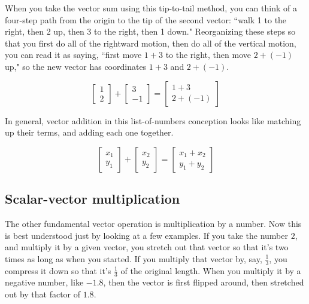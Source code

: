 When you take the vector sum using this tip-to-tail method, you can think of a
four-step path from the origin to the tip of the second vector: ``walk 1 to the
right, then 2 up, then 3 to the right, then 1 down." Reorganizing these steps so
that you first do all of the rightward motion, then do all of the vertical
motion, you can read it as saying, ``first move $1 + 3$ to the right, then move
$2 + (-1)$ up," so the new vector has coordinates $1 + 3$ and $2 + (-1)$.

\begin{equation*}
  \begin{bmatrix}
    1 \\
    2
  \end{bmatrix} + \begin{bmatrix}
    3 \\
    -1
  \end{bmatrix} = \begin{bmatrix}
    1 + 3 \\
    2 + (-1)
  \end{bmatrix}
\end{equation*}

In general, vector addition in this list-of-numbers conception looks like
matching up their terms, and adding each one together.

\begin{equation*}
  \begin{bmatrix}
    x_1 \\
    y_1
  \end{bmatrix} + \begin{bmatrix}
    x_2 \\
    y_2
  \end{bmatrix} = \begin{bmatrix}
    x_1 + x_2 \\
    y_1 + y_2
  \end{bmatrix}
\end{equation*}

\subsection{Scalar-vector multiplication}

The other fundamental vector operation is multiplication by a number. Now this
is best understood just by looking at a few examples. If you take the number
$2$, and multiply it by a given vector, you stretch out that vector so that it's
two times as long as when you started. If you multiply that vector by, say,
$\frac{1}{3}$, you compress it down so that it's $\frac{1}{3}$ of the original
length. When you multiply it by a negative number, like $-1.8$, then the vector
is first flipped around, then stretched out by that factor of $1.8$.

